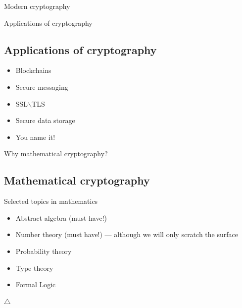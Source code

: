 \documentclass{beamer}
\begin{document}
\begin{frame}{Modern cryptography}
\begin{center}
\begin{minipage}{0.5\linewidth}
    \end{minipage}
    \end{center}
\end{frame}

\begin{frame}{Applications of cryptography}
    \subsection{Applications of cryptography}
    \begin{itemize}
        \item Blockchains
        \item Secure messaging
        \item SSL$\backslash$TLS
        \item Secure data storage
        \item You name it!
    \end{itemize}
\end{frame}

\begin{frame}{Why mathematical cryptography?}
    \subsection{Mathematical cryptography}
    Selected topics in mathematics
    \begin{itemize}
        \item Abstract algebra (must have!)
        \item Number theory (must have!) --- although we will only scratch the 
            surface
        \item Probability theory
        \item Type theory
        \item Formal Logic
    \end{itemize}
	$\triangle$
\end{frame}

\end{document}

